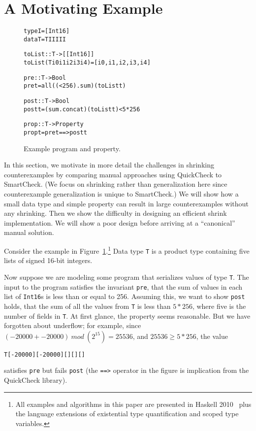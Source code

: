 \documentclass{sigplanconf}
\newenvironment{code}{\begin{alltt}\footnotesize}{\end{alltt}}
\newcommand{\ttp}[1]{\texttt{#1}}
\begin{document}
\section{A Motivating Example}\label{sec:example}

\begin{figure}[ht]
\begin{code}
type I   = [Int16]
data T   = T I I I I I

toList :: T -> [[Int16]]
toList (T i0 i1 i2 i3 i4) = [i0, i1, i2, i3, i4]

pre :: T -> Bool
pre t = all ((< 256) . sum) (toList t)

post :: T -> Bool
post t = (sum . concat) (toList t) < 5 * 256

prop :: T -> Property
prop t = pre t ==> post t
\end{code}
  \caption{Example program and property.}
  \label{fig:initial}
\end{figure}

In this section, we motivate in more detail the challenges in shrinking
counterexamples by comparing manual approaches using QuickCheck to SmartCheck.
(We focus on shrinking rather than generalization here since counterexample
generalization is unique to SmartCheck.)  We will show how a small data type and
simple property can result in large counterexamples without any shrinking.  Then
we show the difficulty in designing an efficient shrink implementation.  We will
show a poor design before arriving at a ``canonical'' manual solution.


Consider the example in Figure~\ref{fig:initial}.\footnote{All examples and
  algorithms in this paper are presented in Haskell 2010~\cite{haskell2010} plus
  the language extensions of existential type quantification and scoped type
  variables.}  Data type \ttp{T} is a product type containing five lists of
signed 16-bit integers.  %

Now suppose we are modeling some program that serializes values of type \ttp{T}.
The input to the program satisfies the invariant \ttp{pre}, that the sum of
values in each list of \ttp{Int16}s is less than or equal to 256.  Assuming
this, we want to show \ttp{post} holds, that the sum of all the values from
\ttp{T} is less than $5 * 256$, where five is the number of fields in \ttp{T}.
At first glance, the property seems reasonable.  But we have forgotten about
underflow; for example, since $(-20000 + -20000) \ mod \ (2^{15}) = 25536$, and
$25536 \ge 5*256$, the value
%
\begin{code}
T [-20000] [-20000] [] [] []
\end{code}
%
\noindent
satisfies \ttp{pre} but fails \ttp{post} (the \ttp{==>} operator in the figure
is implication from the QuickCheck library).
\end{document}
